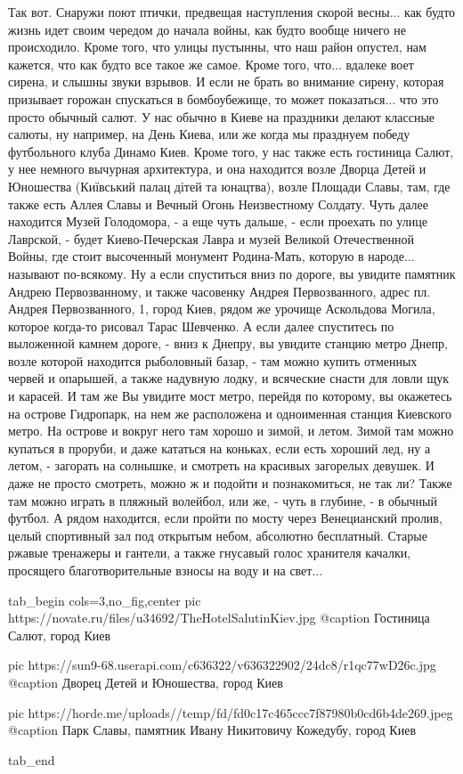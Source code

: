 Так вот. Снаружи поют птички, предвещая наступления скорой весны... как будто
жизнь идет своим чередом до начала войны, как будто вообще ничего не
происходило. Кроме того, что улицы пустынны, что наш район опустел, нам
кажется, что как будто все такое же самое. Кроме того, что... вдалеке воет
сирена, и слышны звуки взрывов.  И если не брать во внимание сирену, которая
призывает горожан спускаться в бомбоубежище, то может показаться... что это
просто обычный салют. У нас обычно в Киеве на праздники делают классные салюты,
ну например, на День Киева, или же когда мы празднуем победу футбольного клуба
Динамо Киев. Кроме того, у нас также есть гостиница Салют, у нее немного
вычурная архитектура, и она находится возле Дворца Детей и Юношества (Київський
палац дітей та юнацтва), возле Площади Славы, там, где также есть Аллея Славы и
Вечный Огонь Неизвестному Солдату. Чуть далее находится Музей Голодомора, - а
еще чуть дальше, - если проехать по улице Лаврской, - будет Киево-Печерская
Лавра и музей Великой Отечественной Войны, где стоит высоченный монумент
Родина-Мать, которую в народе... называют по-всякому. Ну а если спуститься вниз
по дороге, вы увидите памятник Андрею Первозванному, и также часовенку Андрея
Первозванного, адрес пл. Андрея Первозванного, 1, город Киев, рядом же урочище
Аскольдова Могила, которое когда-то рисовал Тарас Шевченко. А если далее
спуститесь по выложенной камнем дороге, - вниз к Днепру, вы увидите станцию
метро Днепр, возле которой находится рыболовный базар, - там можно купить
отменных червей и опарышей, а также надувную лодку, и всяческие снасти для
ловли щук и карасей.  И там же Вы увидите мост метро, перейдя по которому, вы
окажетесь на острове Гидропарк, на нем же расположена и одноименная станция
Киевского метро. На острове и вокруг него там хорошо и зимой, и летом. Зимой
там можно купаться в проруби, и даже кататься на коньках, если есть хороший
лед, ну а летом, - загорать на солнышке, и смотреть на красивых загорелых
девушек. И даже не просто смотреть, можно ж и подойти и познакомиться, не так
ли? Также там можно играть в пляжный волейбол, или же, - чуть в глубине, - в обычный футбол. 
А рядом находится, если пройти по мосту через Венецианский пролив, целый
спортивный зал под открытым небом, абсолютно бесплатный. Старые ржавые
тренажеры и гантели, а также гнусавый голос хранителя качалки, просящего
благотворительные взносы на воду и на свет...

\ifcmt
  tab_begin cols=3,no_fig,center
		 pic https://novate.ru/files/u34692/TheHotelSalutinKiev.jpg
		 @caption Гостиница Салют, город Киев

		 pic https://sun9-68.userapi.com/c636322/v636322902/24dc8/r1qc77wD26c.jpg
		 @caption Дворец Детей и Юношества, город Киев

		 pic https://horde.me/uploads//temp/fd/fd0c17c465ccc7f87980b0cd6b4de269.jpeg
		 @caption Парк Славы, памятник Ивану Никитовичу Кожедубу, город Киев

  tab_end
\fi
